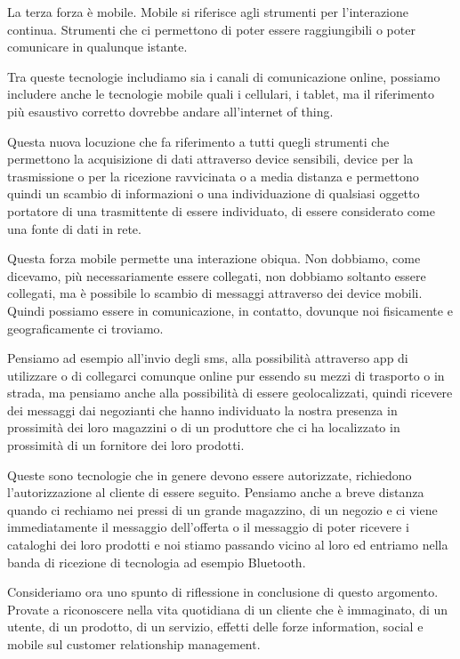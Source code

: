 La terza forza è mobile.
Mobile si riferisce agli strumenti per l'interazione continua.
Strumenti che ci permettono di poter essere raggiungibili o poter comunicare in qualunque istante.

Tra queste tecnologie includiamo sia i canali di comunicazione online, possiamo includere anche le tecnologie mobile quali i cellulari, i tablet, ma il riferimento più esaustivo corretto dovrebbe andare all'internet of thing.

Questa nuova locuzione che fa riferimento a tutti quegli strumenti che permettono la acquisizione di dati attraverso device sensibili, device per la trasmissione o per la ricezione ravvicinata o a media distanza e permettono quindi un scambio di informazioni o una individuazione di qualsiasi oggetto portatore di una trasmittente di essere individuato, di essere considerato come una fonte di dati in rete.

Questa forza mobile permette una interazione obiqua.
Non dobbiamo, come dicevamo, più necessariamente essere collegati, non dobbiamo soltanto essere collegati, ma è possibile lo scambio di messaggi attraverso dei device mobili.
Quindi possiamo essere in comunicazione, in contatto, dovunque noi fisicamente e geograficamente ci troviamo.

Pensiamo ad esempio all'invio degli sms, alla possibilità attraverso app di utilizzare o di collegarci comunque online pur essendo su mezzi di trasporto o in strada, ma pensiamo anche alla possibilità di essere geolocalizzati, quindi ricevere dei messaggi dai negozianti che hanno individuato la nostra presenza in prossimità dei loro magazzini o di un produttore che ci ha localizzato in prossimità di un fornitore dei loro prodotti.

Queste sono tecnologie che in genere devono essere autorizzate, richiedono l'autorizzazione al cliente di essere seguito.
Pensiamo anche a breve distanza quando ci rechiamo nei pressi di un grande magazzino, di un negozio e ci viene immediatamente il messaggio dell'offerta o il messaggio di poter ricevere i cataloghi dei loro prodotti e noi stiamo passando vicino al loro ed entriamo nella banda di ricezione di tecnologia ad esempio Bluetooth.

Consideriamo ora uno spunto di riflessione in conclusione di questo argomento.
Provate a riconoscere nella vita quotidiana di un cliente che è immaginato, di un utente, di un prodotto, di un servizio, effetti delle forze information, social e mobile sul customer relationship management.


